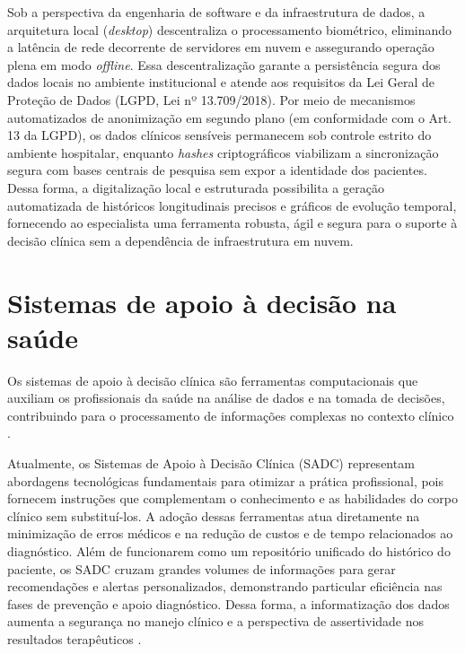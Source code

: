 Sob a perspectiva da engenharia de software e da infraestrutura de dados, a arquitetura local (\textit{desktop}) descentraliza o processamento biométrico, eliminando a latência de rede decorrente de servidores em nuvem e assegurando operação plena em modo \textit{offline}. Essa descentralização garante a persistência segura dos dados locais no ambiente institucional e atende aos requisitos da Lei Geral de Proteção de Dados (LGPD, Lei nº 13.709/2018). Por meio de mecanismos automatizados de anonimização em segundo plano (em conformidade com o Art. 13 da LGPD), os dados clínicos sensíveis permanecem sob controle estrito do ambiente hospitalar, enquanto \textit{hashes} criptográficos viabilizam a sincronização segura com bases centrais de pesquisa sem expor a identidade dos pacientes. Dessa forma, a digitalização local e estruturada possibilita a geração automatizada de históricos longitudinais precisos e gráficos de evolução temporal, fornecendo ao especialista uma ferramenta robusta, ágil e segura para o suporte à decisão clínica sem a dependência de infraestrutura em nuvem.



\section{Sistemas de apoio à decisão na saúde}
\label{sec:Sistemas de apoio}

Os sistemas de apoio à decisão clínica são ferramentas computacionais que auxiliam os profissionais da saúde na análise de dados e na tomada de decisões, contribuindo para o processamento de informações complexas no contexto clínico \cite{shortliffe2014}.

Atualmente, os Sistemas de Apoio à Decisão Clínica (SADC) representam abordagens tecnológicas fundamentais para otimizar a prática profissional, pois fornecem instruções que complementam o conhecimento e as habilidades do corpo clínico sem substituí-los. A adoção dessas ferramentas atua diretamente na minimização de erros médicos e na redução de custos e de tempo relacionados ao diagnóstico. Além de funcionarem como um repositório unificado do histórico do paciente, os SADC cruzam grandes volumes de informações para gerar recomendações e alertas personalizados, demonstrando particular eficiência nas fases de prevenção e apoio diagnóstico. Dessa forma, a informatização dos dados aumenta a segurança no manejo clínico e a perspectiva de assertividade nos resultados terapêuticos \cite{silva2022sistemas}.

